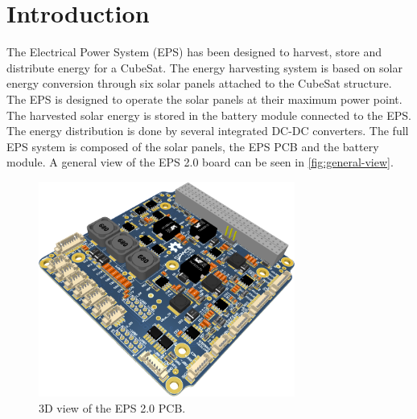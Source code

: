 %
%
%
%
%

%
%
%
%
%
%

\chapter{Introduction} \label{ch:introduction}

The Electrical Power System (EPS) has been designed to harvest, store and distribute energy for a CubeSat. The energy harvesting system is based on solar energy conversion through six solar panels attached to the CubeSat structure. The EPS is designed to operate the solar panels at their maximum power point. The harvested solar energy is stored in the battery module connected to the EPS. The energy distribution is done by several integrated DC-DC converters. The full EPS system is composed of the solar panels, the EPS PCB and the battery module. A general view of the EPS 2.0 board can be seen in \autoref{fig:general-view}.

\begin{figure}[!ht]
    \begin{center}
        \includegraphics[width=0.75\textwidth]{figures/eps2-pcb-3d}
        \caption{3D view of the EPS 2.0 PCB.}
        \label{fig:general-view}
    \end{center}
\end{figure}

